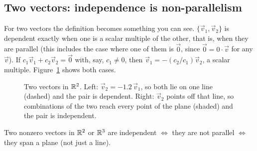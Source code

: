 \subsection*{Two vectors: independence is non-parallelism}

For two vectors the definition becomes something you can see.
$\{\vec{v}_1, \vec{v}_2\}$ is dependent exactly when one is a scalar multiple of
the other, that is, when they are parallel (this includes the case where one of them is
$\vec{0}$, since $\vec{0} = 0\cdot\vec{v}$ for any $\vec{v}$). If $c_1\vec{v}_1 + c_2\vec{v}_2 = \vec{0}$ with, say, $c_1 \ne 0$,
then $\vec{v}_1 = -(c_2/c_1)\vec{v}_2$, a scalar multiple. Figure~\ref{ch14:fig-pairs}
shows both cases.

\begin{figure}[htbp]
\centering
{}
\caption{Two vectors in $\mathbb{R}^2$. Left: $\vec{v}_2 = -1.2\,\vec{v}_1$, so both lie on one
line (dashed) and the pair is dependent. Right: $\vec{v}_2$ points off that line, so
combinations of the two reach every point of the plane (shaded) and the pair is independent.}
\label{ch14:fig-pairs}
\end{figure}

\begin{focusbox}
Two nonzero vectors in $\mathbb{R}^2$ or $\mathbb{R}^3$ are independent $\iff$ they are not parallel $\iff$ they span
a plane (not just a line).
\end{focusbox}

